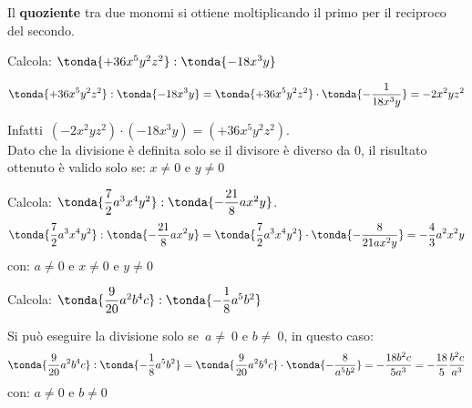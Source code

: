 \begin{definizione}{}{}
Il \textbf{quoziente} tra due
monomi si ottiene moltiplicando il primo per il reciproco del secondo.
\end{definizione}

\begin{esempio}{}{}
Calcola: \(\tonda{+36x^{5}y^{2}z^2}:\tonda{-18x^{3}y}\)

\vspace{-.5em}
\[\tonda{+36x^{5}y^{2}z^2}:\tonda{-18x^{3}y} =
\tonda{+36x^{5}y^{2}z^2} \cdot \tonda{-\frac{1}{18x^{3}y}} =-2x^{2}yz^2\]

\vspace{-.5em}
Infatti~\((-2x^{2}yz^2)\cdot(-18x^{3}y)=(+36x^{5}y^{2}z^2)\).\\
Dato che la divisione è definita solo se il divisore è diverso da 0, il 
risultato ottenuto è valido solo se:
\(x \neq 0 \text{ e } y\neq 0\)
\end{esempio}
% 
% 
% 
\begin{esempio}{}{}
Calcola: 
\(\tonda{\dfrac{7}{2}a^{3}x^{4}y^{2}}:\tonda{-\dfrac{21}{8}ax^{2}y}\).
\[\tonda{\frac{7}{2}a^{3}x^{4}y^{2}}:\tonda{-\frac{21}{8}ax^{2}y} =
  \tonda{\frac{7}{2}a^{3}x^{4}y^{2}}\cdot \tonda{-\frac{8}{21ax^{2}y}} =
  -\frac{4}{3}a^{2}x^{2}y\]
con: \(a \neq 0 \text{ e } x \neq 0 \text{ e } y\neq 0\)
\end{esempio}

\begin{esempio}{}{}
Calcola: 
\(\tonda{\dfrac{9}{20}a^{2}b^{4}c}:\tonda{-{\dfrac{1}{8}}a^{5}b^{2}}\)

Si può eseguire la divisione solo se~\(a\neq~0\text{ e }b\neq~0\), 
in questo caso:
\[\tonda{\frac{9}{20}a^{2}b^{4}c}:\tonda{-{\frac{1}{8}}a^{5}b^{2}} =
\tonda{\frac{9}{20}a^{2}b^{4}c} \cdot \tonda{-\frac{8}{a^{5}b^{2}}} =
-\frac{18b^2c}{5a^3} = -\frac{18}{5} \frac{b^2c}{a^3}\]
con: 
\(a \neq 0 \text{ e } b \neq 0\)
\end{esempio}


